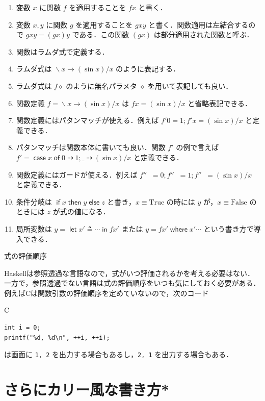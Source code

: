 \documentclass[a4paper,twocolumn]{jsbook}
\newcommand{\programminglanguage}[1]{\textsf{#1}}
\newcommand{\clang}{\programminglanguage{C}}
\newcommand{\haskell}{\programminglanguage{Haskell}}
\newenvironment{note}[1]{\begin{boxnote}\begin{center}#1\end{center}}{\end{boxnote}}
\newcommand{\code}[1]{\texttt{#1}}
\newenvironment{ccode}{\begin{itembox}[r]{\clang}}{\end{itembox}}
\newcommand{\mKeyword}[1]{\mathsf{#1}} %
\newcommand{\mIfKeyword}{\mKeyword{if}}
\newcommand{\mCaseKeyword}{\mKeyword{case}}
\newcommand{\mElseKeyword}{\mKeyword{else}}
\newcommand{\mInKeyword}{\mKeyword{in}}
\newcommand{\mLetKeyword}{\mKeyword{let}}
\newcommand{\mOfKeyword}{\mKeyword{of}}
\newcommand{\mOtherwiseKeyword}{\mKeyword{otherwise}}
\newcommand{\mThenKeyword}{\mKeyword{then}}
\newcommand{\mWhereKeyword}{\mKeyword{where}}
\DeclareMathOperator{\mCase}{\mCaseKeyword} %
\DeclareMathOperator{\mElse}{\mElseKeyword}
\DeclareMathOperator{\mIf}{\mIfKeyword}
\DeclareMathOperator{\mInKW}{\mInKeyword} %
\DeclareMathOperator{\mLet}{\mLetKeyword} %
\DeclareMathOperator{\mOf}{\mOfKeyword} %
\DeclareMathOperator{\mOtherwise}{\mOtherwiseKeyword}
\DeclareMathOperator{\mThen}{\mThenKeyword}
\DeclareMathOperator{\mWhere}{\mWhereKeyword}
\newcommand{\mSpecialConst}[1]{\mathrm{#1}} %
\newcommand{\mFalse}{\mSpecialConst{False}}
\newcommand{\mTrue}{\mSpecialConst{True}}
\newcommand{\mAnonParam}{\diamond}
\newcommand{\mAnyParam}{\_}
\DeclareMathOperator{\mIfSo}{\dashrightarrow}
\DeclareMathOperator{\mLambda}{\backslash}
\DeclareMathOperator{\mLambdaArrow}{\rightarrow}
\DeclareMathOperator{\mLetEq}{\triangleq}
\newcommand{\mGuard}[1]{\mathop{\mid_{#1}}}
\newcommand{\mCaseOf}[1]{\mCase{#1}\mOf}
\newcommand{\mIfThenElse}[3]{\mIf{#1}\mThen{#2}\mElse{#3}}
\newcommand{\mLambdaExp}[2]{\mLambda{#1}\mLambdaArrow{#2}}
\newcommand{\mLetIn}[3]{\mLet{#1\mLetEq#2}\mInKW{#3}}
\newcommand{\mWhere}[2]{\mathbin{\mWhereKeyword}#1\mLetEq#2}
\begin{document}
\begin{enumerate}
\item 変数 $x$ に関数 $f$ を適用することを $fx$ と書く．
\item 変数 $x,y$ に関数 $g$ を適用することを $gxy$ と書く．関数適用は左結合するので $gxy=(gx)y$ である．この関数 $(gx)$ は部分適用された関数と呼ぶ．
\item 関数はラムダ式で定義する．
\item ラムダ式は $\mLambdaExp{x}{(\sin x)/x}$ のように表記する．
\item ラムダ式は $f\mAnonParam$ のように無名パラメタ $\mAnonParam$ を用いて表記しても良い．
\item 関数定義 $f=\mLambdaExp{x}{(\sin x)/x}$ は $fx=(\sin x)/x$ と省略表記できる．
\item 関数定義にはパタンマッチが使える．例えば $f'0=1;f'x=(\sin x)/x$ と定義できる．
\item パタンマッチは関数本体に書いても良い．関数 $f'$ の例で言えば $f'=\mCaseOf{x}0\mIfSo1;\mAnyParam\mIfSo(\sin x)/x$ と定義できる．
\item 関数定義にはガードが使える．例えば $f''\mGuard{x<0}=0;f''\mGuard{x\equiv0}=1;f''\mGuard{\mOtherwise}=(\sin x)/x$ と定義できる．
\item 条件分岐は $\mIfThenElse{x}{y}{z}$ と書き，$x\equiv\mTrue$ の時には $y$ が，$x\equiv\mFalse$ のときには $z$ が式の値になる．
\item 局所変数は $y=\mLetIn{x'}{\dotsb}{fx'}$ または $y=fx'\mWhere{x'}{\dotsb}$ という書き方で導入できる．
\end{enumerate}


\begin{note}{式の評価順序}
\haskell は参照透過な言語なので，式がいつ評価されるかを考える必要はない．一方で，参照透過でない言語は式の評価順序をいつも気にしておく必要がある．例えば\clang は関数引数の評価順序を定めていないので，次のコード
\begin{ccode}
\begin{verbatim}
int i = 0;
printf("%d, %d\n", ++i, ++i);
\end{verbatim}
\end{ccode}
は画面に \code{1, 2} を出力する場合もあるし，\code{2, 1} を出力する場合もある．
\end{note}


\chapter{さらにカリー風な書き方*}
\end{document}
